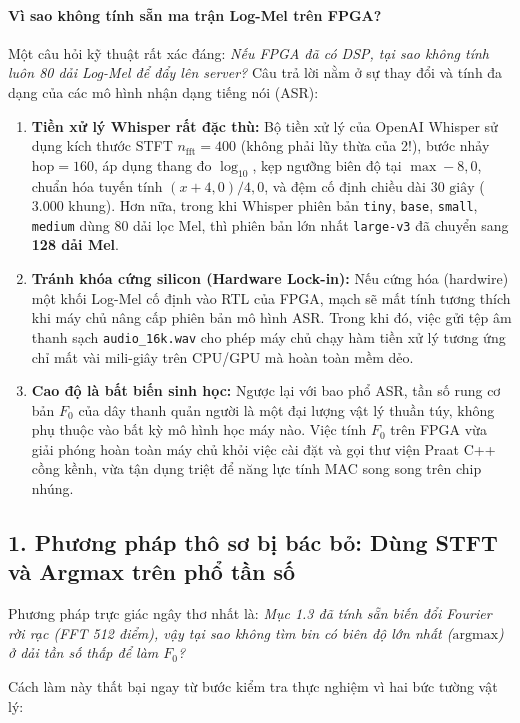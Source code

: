 \documentclass[11pt,a4paper]{article}
\begin{document}
\paragraph{Vì sao không tính sẵn ma trận Log-Mel trên FPGA?}
Một câu hỏi kỹ thuật rất xác đáng: \textit{Nếu FPGA đã có DSP, tại sao không tính luôn 80 dải Log-Mel để đẩy lên server?} Câu trả lời nằm ở sự thay đổi và tính đa dạng của các mô hình nhận dạng tiếng nói (ASR):
\begin{enumerate}
    \setlength{\itemsep}{0.5pt}
    \item \textbf{Tiền xử lý Whisper rất đặc thù:} Bộ tiền xử lý của OpenAI Whisper sử dụng kích thước STFT $n_{\text{fft}} = 400$ (không phải lũy thừa của 2!), bước nhảy $\text{hop} = 160$, áp dụng thang đo $\log_{10}$, kẹp ngưỡng biên độ tại $\max - 8{,}0$, chuẩn hóa tuyến tính $(x + 4{,}0) / 4{,}0$, và đệm cố định chiều dài $30\text{ giây}$ ($3.000$ khung). Hơn nữa, trong khi Whisper phiên bản \texttt{tiny}, \texttt{base}, \texttt{small}, \texttt{medium} dùng 80 dải lọc Mel, thì phiên bản lớn nhất \texttt{large-v3} đã chuyển sang \textbf{128 dải Mel}.
    \item \textbf{Tránh khóa cứng silicon (Hardware Lock-in):} Nếu cứng hóa (hardwire) một khối Log-Mel cố định vào RTL của FPGA, mạch sẽ mất tính tương thích khi máy chủ nâng cấp phiên bản mô hình ASR. Trong khi đó, việc gửi tệp âm thanh sạch \texttt{audio\_16k.wav} cho phép máy chủ chạy hàm tiền xử lý tương ứng chỉ mất vài mili-giây trên CPU/GPU mà hoàn toàn mềm dẻo.
    \item \textbf{Cao độ là bất biến sinh học:} Ngược lại với bao phổ ASR, tần số rung cơ bản $F_0$ của dây thanh quản người là một đại lượng vật lý thuần túy, không phụ thuộc vào bất kỳ mô hình học máy nào. Việc tính $F_0$ trên FPGA vừa giải phóng hoàn toàn máy chủ khỏi việc cài đặt và gọi thư viện Praat C++ cồng kềnh, vừa tận dụng triệt để năng lực tính MAC song song trên chip nhúng.
\end{enumerate}

\subsection*{1. Phương pháp thô sơ bị bác bỏ: Dùng STFT và Argmax trên phổ tần số}

Phương pháp trực giác ngây thơ nhất là: \textit{Mục 1.3 đã tính sẵn biến đổi Fourier rời rạc (FFT 512 điểm), vậy tại sao không tìm bin có biên độ lớn nhất ($\text{argmax}$) ở dải tần số thấp để làm $F_0$?}

Cách làm này thất bại ngay từ bước kiểm tra thực nghiệm vì hai bức tường vật lý:
\end{document}
